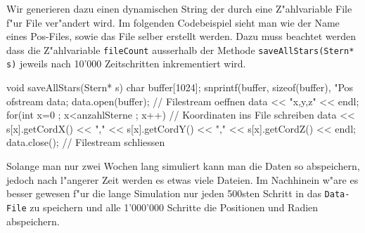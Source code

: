\begin{refsection}
\begin{enumerate}
Wir generieren dazu einen dynamischen String der durch eine Z"ahlvariable
File f"ur File ver"andert wird. Im folgenden Codebeispiel sieht man wie
der Name eines Pos-Files, sowie das File selber erstellt werden. Dazu muss
beachtet werden dass die Z"ahlvariable \texttt{fileCount} ausserhalb der
Methode \texttt{saveAllStars(Stern* s)} jeweils nach 10'000 Zeitschritten
inkrementiert wird.
\end{enumerate}
\begin{Cpp}
void saveAllStars(Stern* s) {
  char buffer[1024];
  snprintf(buffer, sizeof(buffer), "Pos%
  ofstream data;
  data.open(buffer);			          // Filestream oeffnen
  data << "x,y,z" << endl;
  for(int x=0 ; x<anzahlSterne ; x++){    // Koordinaten ins File schreiben
    data << s[x].getCordX() << "," << s[x].getCordY() << "," << s[x].getCordZ() << endl;
  }
  data.close();				         	  // Filestream schliessen
}
\end{Cpp}
Solange man nur zwei Wochen lang simuliert kann man die Daten so
abspeichern, jedoch nach l"angerer Zeit werden es etwas viele Dateien. Im
Nachhinein w"are es besser gewesen f"ur die lange Simulation nur jeden
500sten Schritt in das \texttt{Data-File} zu speichern und alle 1'000'000
Schritte die Positionen und Radien abspeichern.


\end{refsection}
